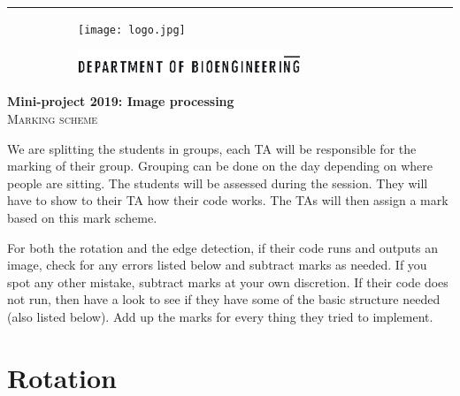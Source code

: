 %
%
%



\hrule

\begin{figure}[t]
	\begin{subfigure}[b]{0.40\linewidth} 					
    \texttt{[image: logo.jpg]}     
  \end{subfigure}
    \hfill
	\begin{subfigure}[B]{0.40\linewidth} 						
    \includegraphics[height=0.8cm]{Pictures/bioengineering_logo_right.eps}
  \end{subfigure}
    \hfill
\end{figure}

\vspace{1cm}


\begin{center}
{\large \textbf{Mini-project 2019: Image processing}} %
\\
\textsc{Marking scheme}
\end{center}
We are splitting the students in groups, each TA will be responsible for the marking of their group. Grouping can be done on the day depending on where people are sitting.
The students will be assessed during the session. They will have to show to their TA how their code works. The TAs will then assign a mark based on this mark scheme.


For both the rotation and the edge detection, if their code runs and outputs an image, check for any errors listed below and subtract marks as needed. If you spot any other mistake, subtract marks at your own discretion.
If their code does not run, then have a look to see if they have some of the basic structure needed (also listed below). Add up the marks for every thing they tried to implement.

\section{Rotation}

